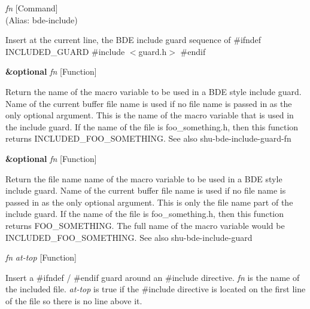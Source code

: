\vspace{1em}
\noindent
{}
\usebox{\funcname}\emph{fn}
 \hfill [Command]\\%
 (Alias: bde-include)

\begin{doc-string}
Insert at the current line, the BDE include guard sequence of
\#ifndef INCLUDED\_GUARD
\#include $<$guard.h$>$
\#endif
\end{doc-string}

\vspace{1em}
\noindent
{}
\usebox{\funcname}\textbf{\&optional} \emph{fn}
 \hfill [Function]

\begin{doc-string}
Return the name of the macro variable to be used in a BDE style include guard.
Name of the current buffer file name is used if no file name is passed in as the
only optional argument.  This is the name of the macro variable that is used in the
include guard.  If the name of the file is foo\_something.h, then this function
returns INCLUDED\_FOO\_SOMETHING.  See also shu-bde-include-guard-fn
\end{doc-string}

\vspace{1em}
\noindent
{}
\usebox{\funcname}\textbf{\&optional} \emph{fn}
 \hfill [Function]

\begin{doc-string}
Return the file name name of the macro variable to be used in a BDE style include
guard.  Name of the current buffer file name is used if no file name is passed in as
the only optional argument.  This is only the file name part of the include guard.
If the name of the file is foo\_something.h, then this function returns
FOO\_SOMETHING.  The full name of the macro variable would be
INCLUDED\_FOO\_SOMETHING.  See also shu-bde-include-guard
\end{doc-string}

\vspace{1em}
\noindent
{}
\usebox{\funcname}\emph{fn} \emph{at-top}
 \hfill [Function]

\begin{doc-string}
Insert a \#ifndef / \#endif guard around an \#include directive.  \emph{fn} is the name of
the included file.  \emph{at-top} is true if the \#include directive is located on the first
line of the file so there is no line above it.
\end{doc-string}

